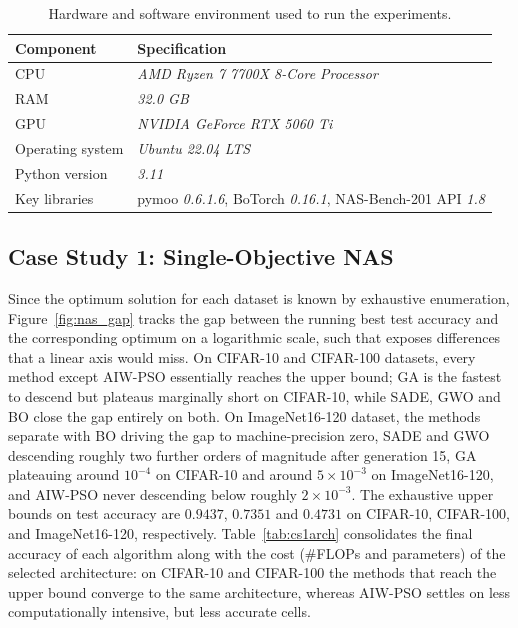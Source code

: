 \documentclass[runningheads]{llncs}
\begin{document}
\begin{table}[t]
\centering
\caption{Hardware and software environment used to run the experiments.}
\label{tab:machine}
\begin{tabular}{ll}
\toprule
\textbf{Component} & \textbf{Specification} \\
\midrule
CPU              & \textit{AMD Ryzen 7 7700X 8-Core Processor} \\
RAM              & \textit{32.0 GB} \\
GPU              & \textit{NVIDIA GeForce RTX 5060 Ti} \\
Operating system & \textit{Ubuntu 22.04 LTS} \\
Python version   & \textit{3.11} \\
Key libraries    & pymoo \textit{0.6.1.6}, BoTorch \textit{0.16.1}, NAS-Bench-201 API \textit{1.8} \\
\bottomrule
\end{tabular}
\end{table}


%
%
\subsection{Case Study 1: Single-Objective NAS} \label{SEC4.2}
Since the optimum solution for each dataset is known by exhaustive enumeration, Figure~\ref{fig:nas_gap} tracks the gap between the running best test accuracy and the corresponding optimum on a logarithmic scale, such that exposes differences that a linear axis would miss. On CIFAR-10 and CIFAR-100 datasets, every method except AIW-PSO essentially reaches the upper bound; GA is the fastest to descend but plateaus marginally short on CIFAR-10, while SADE, GWO and BO close the gap entirely on both. On ImageNet16-120 dataset, the methods separate with BO driving the gap to machine-precision zero, SADE and GWO descending roughly two further orders of magnitude after generation 15, GA plateauing around $10^{-4}$ on CIFAR-10 and around $5 \times 10^{-3}$ on ImageNet16-120, and AIW-PSO never descending below roughly $2 \times 10^{-3}$. The exhaustive upper bounds on test accuracy are $0.9437$, $0.7351$ and $0.4731$ on CIFAR-10, CIFAR-100, and ImageNet16-120, respectively. Table~\ref{tab:cs1arch} consolidates the final accuracy of each algorithm along with the cost (\#FLOPs and parameters) of the selected architecture: on CIFAR-10 and CIFAR-100 the methods that reach the upper bound converge to the same architecture, whereas AIW-PSO settles on less
computationally intensive, but less accurate cells.
\end{document}

